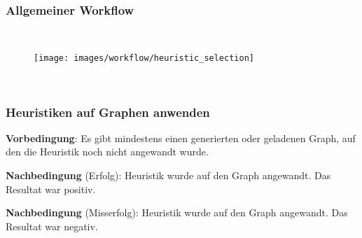 \documentclass{article}
\begin{document}

	

	
	\FloatBarrier
	~\newpage
	\subsubsection{Allgemeiner Workflow}
	~\begin{figure}[!h]
		\centering
		\texttt{[image: images/workflow/heuristic\_selection]}
	\end{figure}
	
	
	
	
	\FloatBarrier
	
	~\newpage
	\subsubsection{Heuristiken auf Graphen anwenden}
	\textbf{Vorbedingung}: Es gibt mindestens einen generierten oder geladenen Graph, auf den die Heuristik noch nicht angewandt wurde.
	
	\textbf{Nachbedingung} (Erfolg): Heuristik wurde auf den Graph angewandt. Das Resultat war positiv.
	
	\textbf{Nachbedingung} (Misserfolg): Heuristik wurde auf den Graph angewandt. Das Resultat war negativ.
	
\end{document}
